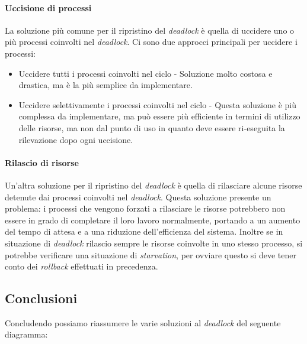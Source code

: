             \paragraph{Uccisione di processi}
                La soluzione più comune per il ripristino del \textit{deadlock} è quella di uccidere uno o più processi coinvolti nel \textit{deadlock}. Ci sono due approcci principali per uccidere i processi:
                \begin{itemize}
                    \item Uccidere tutti i processi coinvolti nel ciclo - Soluzione molto costosa e drastica, ma è la più semplice da implementare.
                    \item Uccidere selettivamente i processi coinvolti nel ciclo - Questa soluzione è più complessa da implementare, ma può essere più efficiente in termini di utilizzo delle risorse, ma non dal punto di uso in quanto deve essere ri-eseguita la rilevazione dopo ogni uccisione.
                \end{itemize}
            \paragraph{Rilascio di risorse}
                Un'altra soluzione per il ripristino del \textit{deadlock} è quella di rilasciare alcune risorse detenute dai processi coinvolti nel \textit{deadlock}. Questa soluzione presente un problema: i processi che vengono forzati a rilasciare le risorse potrebbero non essere in grado di completare il loro lavoro normalmente, portando a un aumento del tempo di attesa e a una riduzione dell'efficienza del sistema. Inoltre se in situazione di \textit{deadlock} rilascio sempre le risorse coinvolte in uno stesso processo, si potrebbe verificare una situazione di \textit{starvation}, per ovviare questo si deve tener conto dei \textit{rollback} effettuati in precedenza.
    \subsection{Conclusioni}   
        Concludendo possiamo riassumere le varie soluzioni al \textit{deadlock} del seguente diagramma:
        \begin{figure}[H]
            \centering
        \end{figure}

